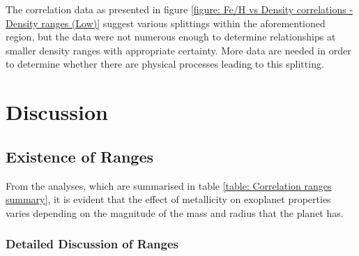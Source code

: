 \documentclass[a4paper,twocolumn,12pt]{article}
\begin{document}
The correlation data as presented in figure \ref{figure: Fe/H vs Density correlations - Density ranges (Low)} suggest various splittings within the aforementioned region, but the data were not numerous enough to determine relationships at smaller density ranges with appropriate certainty. More data are needed in order to determine whether there are physical processes leading to this splitting.











\section{Discussion}
\subsection{Existence of Ranges}
From the analyses, which are summarised in table \ref{table: Correlation ranges summary}, it is evident that the effect of metallicity on exoplanet properties varies depending on the magnitude of the mass and radius that the planet has.

\subsubsection{Detailed Discussion of Ranges}
\vspace{1.7em}
\end{document}
